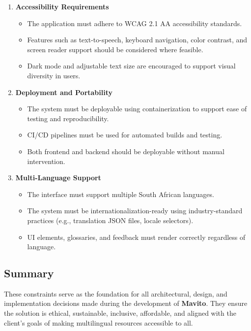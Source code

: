 \documentclass[12pt]{article}
\begin{document}
\begin{enumerate}[label=2.\arabic*, leftmargin=2.5em]
    \item \textbf{Accessibility Requirements}
    \begin{itemize}
        \item The application must adhere to WCAG 2.1 AA accessibility standards.
        \item Features such as text-to-speech, keyboard navigation, color contrast, and screen reader support should be considered where feasible.
        \item Dark mode and adjustable text size are encouraged to support visual diversity in users.
    \end{itemize}

    \item \textbf{Deployment and Portability}
    \begin{itemize}
        \item The system must be deployable using containerization to support ease of testing and reproducibility.
        \item CI/CD pipelines must be used for automated builds and testing.
        \item Both frontend and backend should be deployable without manual intervention.
    \end{itemize}

    \item \textbf{Multi-Language Support}
    \begin{itemize}
        \item The interface must support multiple South African languages.
        \item The system must be internationalization-ready using industry-standard practices (e.g., translation JSON files, locale selectors).
        \item UI elements, glossaries, and feedback must render correctly regardless of language.
    \end{itemize}

\end{enumerate}

\subsection{Summary}
These constraints serve as the foundation for all architectural, design, and implementation decisions made during the development of \textbf{Mavito}. They ensure the solution is ethical, sustainable, inclusive, affordable, and aligned with the client’s goals of making multilingual resources accessible to all.
\end{document}
